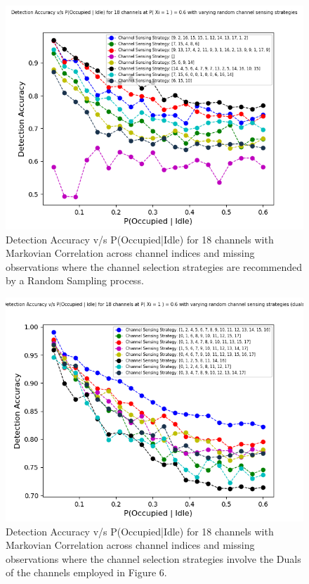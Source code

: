 \documentclass[12pt, draftcls, onecolumn]{IEEEtran}
\begin{document}
\begin{figure}[t]
\includegraphics[width=1.0\textwidth]{Random_Channel_Sensing.png}
\caption{Detection Accuracy v/s P(Occupied|Idle) for 18 channels with Markovian Correlation across channel indices and missing observations where the channel selection strategies are recommended by a Random Sampling process.}
\label{fig:mesh6}
\centering
\end{figure}
\begin{figure}[t]
\includegraphics[width=1.0\textwidth]{Random_Channel_Sensing_Duals.png}
\caption{Detection Accuracy v/s P(Occupied|Idle) for 18 channels with Markovian Correlation across channel indices and missing observations where the channel selection strategies involve the Duals of the channels employed in Figure 6.}
\label{fig:mesh7}
\centering
\end{figure}
\end{document}
